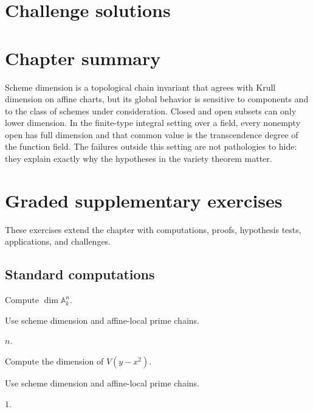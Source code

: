 \ifdefined\IncludeChallengeSolutions
\section{Challenge solutions}

\fi

\section{Chapter summary}\label{sec:vi30-synthesis}
Scheme dimension is a topological chain invariant that agrees with Krull dimension on affine charts, but its global
behavior is sensitive to components and to the class of schemes under consideration.  Closed and open subsets can
only lower dimension.  In the finite-type integral setting over a field, every nonempty open has full dimension and
that common value is the transcendence degree of the function field.  The failures outside this setting are not
pathologies to hide: they explain exactly why the hypotheses in the variety theorem matter.

\section{Graded supplementary exercises}
These exercises extend the chapter with computations, proofs, hypothesis tests, applications, and challenges.

\subsection*{Standard computations}

\begin{exercise}\label{exr:vi30-expand-01}
Compute $\dim\mathbb A^n_k$.
\end{exercise}
\begin{hint}
Use scheme dimension and affine-local prime chains.
\end{hint}
\begin{solution}
$n$.
\end{solution}

\begin{exercise}[Parabola]\label{exr:vi30-expand-02}
Compute the dimension of $V(y-x^2)$.
\end{exercise}
\begin{hint}
Use scheme dimension and affine-local prime chains.
\end{hint}
\begin{solution}
$1$.
\end{solution}


